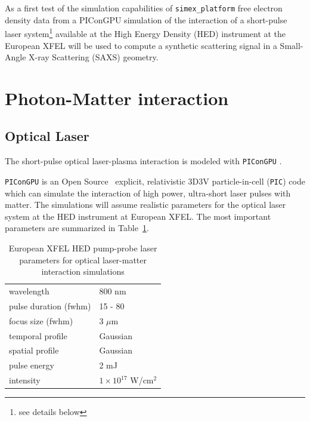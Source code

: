 \documentclass[12pt]{scrartcl}
\begin{document}
As a first test of the simulation capabilities of \texttt{simex\_platform}
free electron density data from a PIConGPU simulation of the interaction of a
short-pulse laser system\footnote{see details below} available at the High
Energy Density (HED) instrument \cite{Nakatsutsumi2014} at the European XFEL
will be used to compute a synthetic scattering signal in a Small-Angle X-ray
Scattering (SAXS) geometry.
%
\section{Photon-Matter interaction}
\subsection{Optical Laser}
The short-pulse
optical laser-plasma interaction is modeled with \texttt{PIConGPU}
\cite{Bussmann2013}.

\texttt{PIConGPU} is an Open Source~\cite{picongpu_github} explicit,
relativistic 3D3V particle-in-cell (\texttt{PIC}) code which can simulate the
interaction of high power, ultra-short laser pulses with matter.  The
simulations will assume realistic parameters for the optical laser system at the
HED instrument at European XFEL. The most important parameters are summarized in
Table~\ref{tab:short_pulse_laser_parameters}.
\begin{table}[h]
\centering
\begin{tabular}{|l|l|}
  \hline wavelength & 800 nm \\
  pulse duration (fwhm) & 15 - 80 \\
  focus size (fwhm)  & 3 $\mu\text{m}$ \\
  temporal profile &  Gaussian \\
  spatial profile &  Gaussian \\
  pulse energy & 2 mJ \\
  intensity  & $1\times 10^{17}$ W/cm$^2$ \\
  \hline
\end{tabular}
\caption{European XFEL HED pump-probe laser parameters for optical laser-matter interaction
simulations}
\label{tab:short_pulse_laser_parameters}
\end{table}
\end{document}
